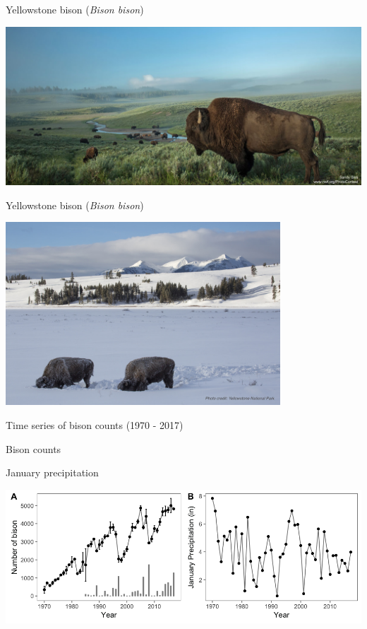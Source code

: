 \documentclass[14pt, compress, aspectratio=1610]{beamer}
\providecommand{\tightlist}{%
  \setlength{\itemsep}{0pt}\setlength{\parskip}{0pt}}
\begin{document}
\begin{frame}{%
\protect\hypertarget{yellowstone-bison-bison-bison}{%
Yellowstone bison (\emph{Bison bison})}}

\includegraphics[width=\textwidth]{./figures/National-Park_Sandy-Sist.jpg}

\end{frame}

\begin{frame}{%
\protect\hypertarget{yellowstone-bison-bison-bison-1}{%
Yellowstone bison (\emph{Bison bison})}}

\centering

\includegraphics[height=2.7in]{./figures/bison_winter.jpg}

\end{frame}

\begin{frame}{%
\protect\hypertarget{time-series-of-bison-counts-1970---2017}{%
Time series of bison counts (1970 - 2017)}}

\begin{description}
\tightlist
\item[Response]
Bison counts
\item[Covariate]
January precipitation
\end{description}

\includegraphics[width=\textwidth]{./figures/bison_data_plots.png}

\end{frame}
\end{document}
